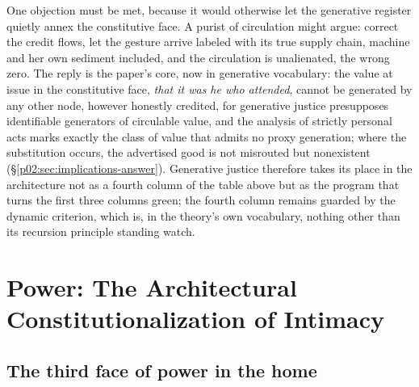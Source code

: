\documentclass[11pt,a4paper]{article}
\begin{document}
One objection must be met, because it would otherwise let the generative register quietly annex the constitutive face. A purist of circulation might argue: correct the credit flows, let the gesture arrive labeled with its true supply chain, machine and her own sediment included, and the circulation is unalienated, the wrong zero. The reply is the paper's core, now in generative vocabulary: the value at issue in the constitutive face, \emph{that it was he who attended}, cannot be generated by any other node, however honestly credited, for generative justice presupposes identifiable generators of circulable value, and the analysis of strictly personal acts marks exactly the class of value that admits no proxy generation; where the substitution occurs, the advertised good is not misrouted but nonexistent (\S\ref{p02:sec:implications-answer}). Generative justice therefore takes its place in the architecture not as a fourth column of the table above but as the program that turns the first three columns green; the fourth column remains guarded by the dynamic criterion, which is, in the theory's own vocabulary, nothing other than its recursion principle standing watch.

\section{Power: The Architectural Constitutionalization of Intimacy}
\label{p02:sec:power}

\subsection{The third face of power in the home}
\label{p02:sec:power-faces}
\end{document}
